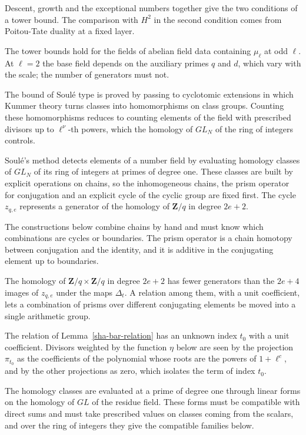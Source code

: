 Descent, growth and the exceptional numbers together give the two conditions of a tower bound. The comparison with $H^2$ in the second condition comes from Poitou-Tate duality at a fixed layer.

The tower bounds hold for the fields of abelian field data containing $\mu_\ell$ at odd $\ell$. At $\ell=2$ the base field depends on the auxiliary primes $q$ and $d$, which vary with the scale; the number of generators must not.

The bound of Soulé type is proved by passing to cyclotomic extensions in which Kummer theory turns classes into homomorphisms on class groups. Counting these homomorphisms reduces to counting elements of the field with prescribed divisors up to $\ell^\nu$-th powers, which the homology of $GL_N$ of the ring of integers controls.

Soulé's method detects elements of a number field by evaluating homology classes of $GL_N$ of its ring of integers at primes of degree one. These classes are built by explicit operations on chains, so the inhomogeneous chains, the prism operator for conjugation and an explicit cycle of the cyclic group are fixed first. The cycle $z_{q,e}$ represents a generator of the homology of $\mathbf Z/q$ in degree $2e+2$.

The constructions below combine chains by hand and must know which combinations are cycles or boundaries. The prism operator is a chain homotopy between conjugation and the identity, and it is additive in the conjugating element up to boundaries.

The homology of $\mathbf Z/q\times\mathbf Z/q$ in degree $2e+2$ has fewer generators than the $2e+4$ images of $z_{q,e}$ under the maps $\Delta_t$. A relation among them, with a unit coefficient, lets a combination of prisms over different conjugating elements be moved into a single arithmetic group.

The relation of Lemma~\ref{sha-bar-relation} has an unknown index $t_0$ with a unit coefficient. Divisors weighted by the function $\eta$ below are seen by the projection $\pi_{t_0}$ as the coefficients of the polynomial whose roots are the powers of $1+\ell^c$, and by the other projections as zero, which isolates the term of index $t_0$.

The homology classes are evaluated at a prime of degree one through linear forms on the homology of $GL$ of the residue field. These forms must be compatible with direct sums and must take prescribed values on classes coming from the scalars, and over the ring of integers they give the compatible families below.

